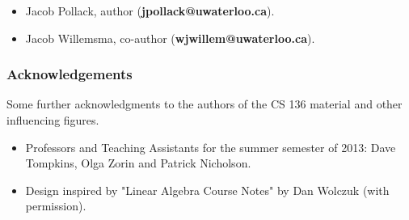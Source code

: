\begin{itemize}

\item Jacob Pollack, author (\textbf{jpollack@uwaterloo.ca}).
\item Jacob Willemsma, co-author (\textbf{wjwillem@uwaterloo.ca}).

\end{itemize}

\subsubsection*{Acknowledgements}

Some further acknowledgments to the authors of the CS 136 material and other influencing figures.

\begin{itemize}

\item Professors and Teaching Assistants for the summer semester of 2013: Dave Tompkins, Olga Zorin and Patrick Nicholson.
\item Design inspired by "Linear Algebra Course Notes" by Dan Wolczuk (with permission).

\end{itemize}
